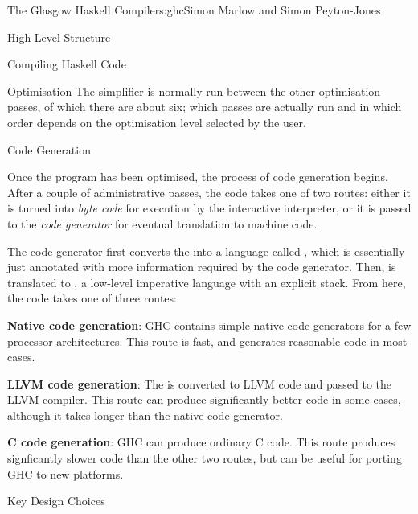 \begin{aosachapter}{The Glasgow Haskell Compiler}{s:ghc}{Simon Marlow and Simon Peyton-Jones}
\begin{aosasect1}{High-Level Structure}
\begin{aosasect2}{Compiling Haskell Code}
\begin{aosasect3}{Optimisation}
The simplifier is normally run between the other optimisation passes,
of which there are about six; which passes are actually run and in
which order depends on the optimisation level selected by the user.

\end{aosasect3}

\begin{aosasect3}{Code Generation}

Once the  program has been optimised, the process of code
generation begins.  After a couple of administrative passes, the code
takes one of two routes: either it is turned into \emph{byte code} for
execution by the interactive interpreter, or it is passed to the
\emph{code generator} for eventual translation to machine code.

The code generator first converts the  into a language called
, which is essentially just  annotated with more
information required by the code generator.  Then,  is translated
to , a low-level imperative language with an explicit stack. From
here, the code takes one of three routes:

\begin{aosaitemize}

\item \textbf{Native code generation}: GHC contains simple native code
  generators for a few processor architectures.  This route is fast,
  and generates reasonable code in most cases.

\item \textbf{LLVM code generation}: The  is converted to
  LLVM code and passed to the LLVM compiler.  This route can produce
  significantly better code in some cases, although it takes longer
  than the native code generator.

\item \textbf{C code generation}: GHC can produce ordinary C code.
  This route produces signficantly slower code than the other two
  routes, but can be useful for porting GHC to new platforms.

\end{aosaitemize}

\end{aosasect3}

\end{aosasect2}

\end{aosasect1}

\begin{aosasect1}{Key Design Choices}


\end{aosasect1}
\end{aosachapter}
